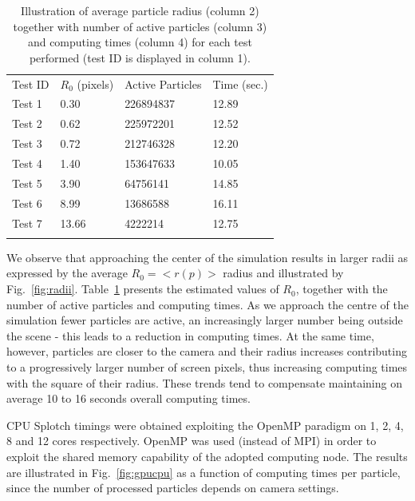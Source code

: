 \documentclass[smallextended]{svjour3}
\begin{document}
\begin{table}
\caption{Illustration of average particle radius (column 2) together with number of active particles (column 3)
and computing times (column 4) for each test performed (test ID is displayed in column 1).}
\label{tab:radius}
\begin{tabular}{llll}
\hline\noalign{\smallskip}
Test ID & $R_0$ (pixels) & Active Particles & Time (sec.) \\
\noalign{\smallskip} \hline \noalign{\smallskip}
Test 1  & 0.30   & 226894837  & 12.89 \\
Test 2  & 0.62   & 225972201  & 12.52 \\
Test 3  & 0.72   & 212746328  & 12.20 \\
Test 4  & 1.40   & 153647633  & 10.05 \\
Test 5  & 3.90   & 64756141   & 14.85 \\
Test 6  & 8.99   & 13686588   & 16.11 \\
Test 7  & 13.66  & 4222214    & 12.75 \\
\noalign{\smallskip} \hline
\end{tabular}
\end{table}

We observe that approaching the center of the simulation results in larger radii 
as expressed by the average $R_0=<r(p)>$ radius and illustrated by Fig.~\ref{fig:radii}. 
Table~\ref{tab:radius} presents the estimated values of $R_0$, together with the number of active particles and computing times. As we approach the centre of the simulation fewer particles are active, an increasingly larger 
number being outside the scene - this leads to a reduction in computing times. At the same
time, however, particles are closer to the camera and their radius increases contributing to 
a progressively larger number of screen pixels,
thus increasing computing times with the square of their radius. 
These trends tend to compensate maintaining on average 10 to 16 seconds overall computing times.

CPU Splotch timings were obtained exploiting the OpenMP paradigm on 1, 2, 4, 8 and 12 cores respectively. OpenMP was used (instead of MPI) in order to exploit the shared memory capability of the adopted computing node. The results are illustrated in Fig.~\ref{fig:gpucpu} as a function of computing times per particle, since the number of processed particles depends on camera settings.
\end{document}
